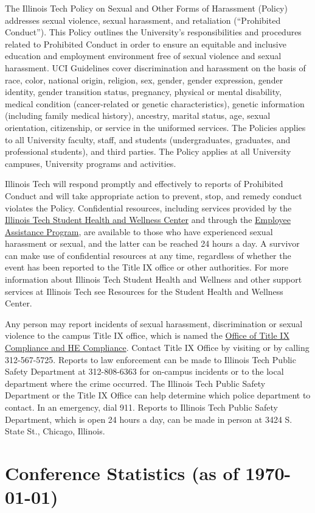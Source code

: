 The Illinois Tech Policy on Sexual and Other Forms of Harassment (Policy) addresses sexual violence, sexual harassment, and retaliation (“Prohibited Conduct”). This Policy outlines the University’s responsibilities and procedures related to Prohibited Conduct in order to ensure an equitable and inclusive education and employment environment free of sexual violence and sexual harassment. UCI Guidelines cover discrimination and harassment on the basis of race, color, national origin, religion, sex, gender, gender expression, gender identity, gender transition status, pregnancy, physical or mental disability, medical condition (cancer-related or genetic characteristics), genetic information (including family medical history), ancestry, marital status, age, sexual orientation, citizenship, or service in the uniformed services. The Policies applies to all University faculty, staff, and students (undergraduates, graduates, and professional students), and third parties. The Policy applies at all University campuses, University programs and activities.

Illinois Tech  will respond promptly and effectively to reports of Prohibited Conduct and will take appropriate action to prevent, stop, and remedy conduct violates the Policy.
Confidential resources, including services provided by the \href{https://www.iit.edu/shwc}{Illinois Tech Student Health and Wellness Center}
 and through the \href{https://portal.iit.edu/pages/human-resources-employee-assistance-program}{Employee Assistance Program}, are available to those who have experienced sexual harassment or sexual, and the latter can be reached 24 hours a day. A survivor can make use of confidential resources at any time, regardless of whether the event has been reported to the Title IX office or other authorities. For more information about Illinois Tech Student Health and Wellness and other support services at Illinois Tech see  Resources for the Student Health and Wellness Center.

Any person may report incidents of sexual harassment, discrimination or sexual violence to the campus Title IX office, which is named the
\href{https://www.iit.edu/title-ix}{Office of Title IX Compliance and HE Compliance}. Contact Title IX Office  by visiting  or by calling 312-567-5725.
Reports to law enforcement can be made to Illinois Tech Public Safety Department at 312-808-6363 for on-campus incidents or to the local department where the crime occurred. The Illinois Tech Public Safety Department or the Title IX Office can help determine which police department to contact. In an emergency, dial 911. Reports to Illinois Tech Public Safety Department, which is open 24 hours a day, can be made in person at 3424 S. State St., Chicago, Illinois.





\section{Conference Statistics (as of \today)}

